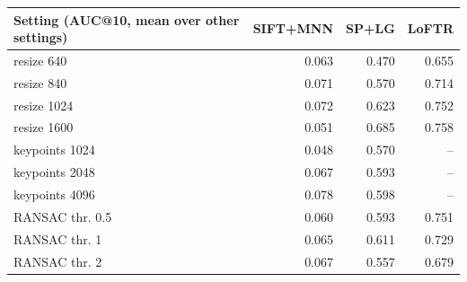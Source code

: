 \begin{tabular}{lrrr}
\toprule
Setting (AUC@10, mean over other settings) & SIFT+MNN & SP+LG & LoFTR \\
\midrule
resize 640 & 0.063 & 0.470 & 0.655 \\
resize 840 & 0.071 & 0.570 & 0.714 \\
resize 1024 & 0.072 & 0.623 & 0.752 \\
resize 1600 & 0.051 & 0.685 & 0.758 \\
keypoints 1024 & 0.048 & 0.570 & -- \\
keypoints 2048 & 0.067 & 0.593 & -- \\
keypoints 4096 & 0.078 & 0.598 & -- \\
RANSAC thr. 0.5 & 0.060 & 0.593 & 0.751 \\
RANSAC thr. 1 & 0.065 & 0.611 & 0.729 \\
RANSAC thr. 2 & 0.067 & 0.557 & 0.679 \\
\bottomrule
\end{tabular}